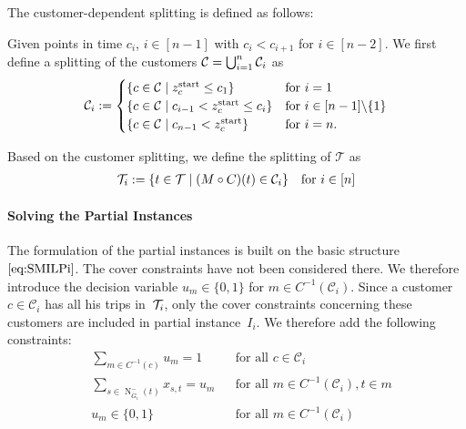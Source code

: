 The customer-dependent splitting is defined as follows:

\begin{definition}
\label{def:customer_dependent_splitting}

Given points in time $c_i$, $i\in[n-1]$ with $c_i<c_{i+1}$ for $i\in[n-2]$. We first define a splitting of the customers $\mathcal{C}=\bigcup_{i=1}^n\mathcal{C}_i$ as
\begin{align*}
	\mathcal{C}_i := \begin{cases}
		\left\{c\in\mathcal{C}\mid z^{\operatorname{start}}_c\leq c_1\right\} & \text{for } i=1 \\
		\left\{c\in\mathcal{C}\mid c_{i-1}<z^{\operatorname{start}}_c\leq c_i\right\} & \text{for } i\in[n-1]\backslash\{1\} \\
		\left\{c\in\mathcal{C}\mid c_{n-1}<z^{\operatorname{start}}_c\right\} & \text{for } i=n.
	\end{cases}
\end{align*}

Based on the customer splitting, we define the splitting of $\mathcal{T}$ as
\begin{align*}
	\mathcal{T}_i := \left\{t\in\mathcal{T}\mid (M\circ C)(t)\in\mathcal{C}_i\right\} && \text{for } i\in[n]
\end{align*}

\end{definition}

\paragraph{Solving the Partial Instances} \parfill

The formulation of the partial instances is built on the basic structure $\eqref{eq:SMILPi}$. The cover constraints have not been considered there. We therefore introduce the decision variable $u_m\in\{0,1\}$ for $m\in C^{-1}\left(\mathcal{C}_i\right)$. Since a customer $c\in\mathcal{C}_i$ has all his trips in~$\mathcal{T}_i$, only the cover constraints concerning these customers are included in partial instance~$I_i$. We therefore add the following constraints:
\begin{align}
	& \sum_{m\in C^{-1}(c)} u_m = 1 && \text{for all } c\in\mathcal{C}_i \label{eq:CMILP:customer} \\
	& \sum_{s\in\operatorname{N}_{\overline{G}_i}^-(t)} x_{s,t} = u_m && \text{for all } m\in C^{-1}\left(\mathcal{C}_i\right), t\in m \label{eq:CMILP:route} \\
	& u_m\in\{0,1\} && \text{for all } m\in C^{-1}\left(\mathcal{C}_i\right) \label{eq:CMILP:um}
\end{align}

